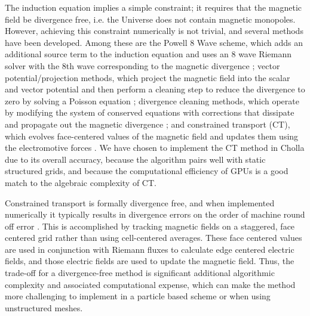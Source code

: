 \documentclass[modern]{aastex631}
\begin{document}
The induction equation implies a simple constraint; it requires that the magnetic field be divergence free, i.e. the Universe does not contain magnetic monopoles. However, achieving this constraint numerically is not trivial, and several methods have been developed. Among these are the Powell 8 Wave scheme, which adds an additional source term to the induction equation and uses an 8 wave Riemann solver with the 8th wave corresponding to the magnetic divergence \citep{Powell1997};
vector potential/projection methods, which project the magnetic field into the scalar and vector potential and then perform a cleaning step to reduce the divergence to zero by solving a Poisson equation \citep{brackbill_1980,ryu_1995,Crockett_2005,torrilhon2005locally};
divergence cleaning methods, which operate by modifying the system of conserved equations with corrections that dissipate and propagate out the magnetic divergence \citep{dedner_hyperbolic_2002,mignone_2010}; and constrained transport (CT), which evolves face-centered values of the magnetic field and updates them using the electromotive forces \citep{evans_1988}.
We have chosen to implement the CT method in Cholla due to its overall accuracy, because the algorithm pairs well with static structured grids, and because the computational efficiency of GPUs is a good match to the algebraic complexity of CT.

Constrained transport is formally divergence free, and when implemented numerically it typically results in divergence errors on the order of machine round off error \citep{evans_1988, gardiner_2005, stone_athena_2008, stone_2009, zingale_castro_2020, almgren_castro_2020}. This is accomplished by tracking magnetic fields on a staggered, face centered grid rather than using cell-centered averages. These face centered values are used in conjunction with Riemann fluxes to calculate edge centered electric fields, and those electric fields are used to update the magnetic field. Thus, the trade-off for a divergence-free method is significant additional algorithmic complexity and associated computational expense, which can make the method more challenging to implement in a particle based scheme or when using unstructured meshes.
\end{document}
